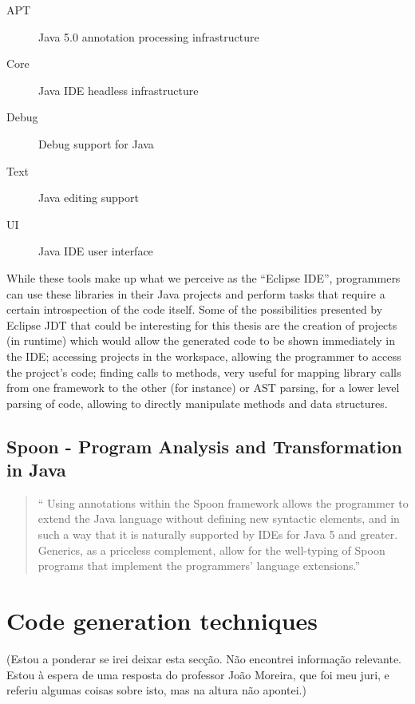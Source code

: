 	\begin{description}
		\item[APT] Java 5.0 annotation processing infrastructure
		\item[Core] Java IDE headless infrastructure
		\item[Debug] Debug support for Java
		\item[Text] Java editing support
		\item[UI] Java IDE user interface 
	\end{description}

	While these tools make up what we perceive as the ``Eclipse IDE'', programmers can use these libraries in their Java projects and perform tasks that require a certain introspection of the code itself. Some of the possibilities presented by Eclipse JDT that could be interesting for this thesis are the creation of projects (in runtime) which would allow the generated code to be shown immediately in the IDE; accessing projects in the workspace, allowing the programmer to access the project's code; finding calls to methods, very useful for mapping library calls from one framework to the other (for instance) or AST parsing, for a lower level parsing of code, allowing to directly manipulate methods and data structures.


\subsection{Spoon - Program Analysis and Transformation in Java}
\begin{quote}
	`` Using annotations within the Spoon framework allows the programmer to extend the Java language without defining new syntactic elements, and in such a way that it is naturally supported by IDEs for Java 5 and greater. Generics, as a priceless complement, allow for the well-typing of Spoon programs that implement the programmers' language extensions.'' \cite{eclipseJDT}
\end{quote}




\section{Code generation techniques}
(Estou a ponderar se irei deixar esta secção. Não encontrei informação relevante. Estou à espera de uma resposta do professor João Moreira, que foi meu juri, e referiu algumas coisas sobre isto, mas na altura não apontei.)


